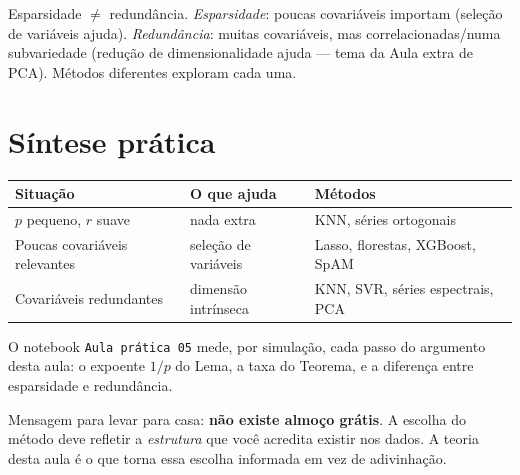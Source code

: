 \documentclass[11pt,a4paper]{article}
\begin{document}
\begin{ideia}
Esparsidade $\neq$ redundância. \emph{Esparsidade}: poucas covariáveis importam
(seleção de variáveis ajuda). \emph{Redundância}: muitas covariáveis, mas
correlacionadas/numa subvariedade (redução de dimensionalidade ajuda --- tema da
Aula extra de PCA). Métodos diferentes exploram cada uma.
\end{ideia}

\section{Síntese prática}
\begin{center}\small
\renewcommand{\arraystretch}{1.3}
\begin{tabular}{@{}lll@{}}
\toprule
\textbf{Situação} & \textbf{O que ajuda} & \textbf{Métodos} \\
\midrule
$p$ pequeno, $r$ suave & nada extra & KNN, séries ortogonais \\
Poucas covariáveis relevantes & seleção de variáveis & Lasso, florestas, XGBoost, SpAM \\
Covariáveis redundantes & dimensão intrínseca & KNN, SVR, séries espectrais, PCA \\
\bottomrule
\end{tabular}
\end{center}

O notebook \texttt{Aula prática 05} mede, por simulação, cada passo do argumento
desta aula: o expoente $1/p$ do Lema, a taxa do Teorema, e a diferença entre
esparsidade e redundância.

\begin{atencao}
Mensagem para levar para casa: \textbf{não existe almoço grátis}. A escolha do
método deve refletir a \emph{estrutura} que você acredita existir nos dados. A
teoria desta aula é o que torna essa escolha informada em vez de adivinhação.
\end{atencao}

\end{document}

